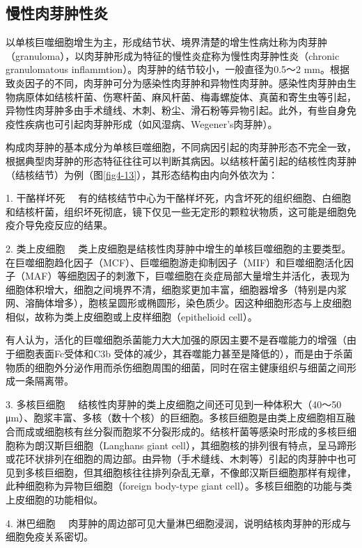 \subsection{慢性肉芽肿性炎}

以单核巨噬细胞增生为主，形成结节状、境界清楚的增生性病灶称为肉芽肿（granuloma），以肉芽肿形成为特征的慢性炎症称为慢性肉芽肿性炎（chronic
granulomatous inflammtion）。肉芽肿的结节较小，一般直径为0.5～2
mm。根据致炎因子的不同，肉芽肿可分为感染性肉芽肿和异物性肉芽肿。感染性肉芽肿由生物病原体如结核杆菌、伤寒杆菌、麻风杆菌、梅毒螺旋体、真菌和寄生虫等引起，异物性肉芽肿多由手术缝线、木刺、粉尘、滑石粉等异物引起。此外，有些自身免疫性疾病也可引起肉芽肿形成（如风湿病、Wegener's肉芽肿）。

构成肉芽肿的基本成分为单核巨噬细胞，不同病因引起的肉芽肿形态不完全一致，根据典型肉芽肿的形态特征往往可以判断其病因。以结核杆菌引起的结核性肉芽肿（结核结节）为例（图\ref{fig4-13}），其形态结构由内向外依次为：

{1. 干酪样坏死}
　有的结核结节中心为干酪样坏死，内含坏死的组织细胞、白细胞和结核杆菌，组织坏死彻底，镜下仅见一些无定形的颗粒状物质，这可能是细胞免疫介导免疫反应的结果。

{2. 类上皮细胞}
　类上皮细胞是结核性肉芽肿中增生的单核巨噬细胞的主要类型。在巨噬细胞趋化因子（MCF）、巨噬细胞游走抑制因子（MIF）和巨噬细胞活化因子（MAF）等细胞因子的刺激下，巨噬细胞在炎症局部大量增生并活化，表现为细胞体积增大，细胞之间境界不清，细胞浆更加丰富，细胞器增多（特别是内浆网、溶酶体增多），胞核呈圆形或椭圆形，染色质少。因这种细胞形态与上皮细胞相似，故称为类上皮细胞或上皮样细胞（epithelioid
cell）。

有人认为，活化的巨噬细胞杀菌能力大大加强的原因主要不是吞噬能力的增强（由于细胞表面Fc受体和C{3b}
受体的减少，其吞噬能力甚至是降低的），而是由于杀菌物质的细胞外分泌作用而杀伤细胞周围的细菌，同时在宿主健康组织与细菌之间形成一条隔离带。

{3. 多核巨细胞} 　结核性肉芽肿的类上皮细胞之间还可见到一种体积大（40～50
μm）、胞浆丰富、多核（数十个核）的巨细胞。多核巨细胞是由类上皮细胞相互融合而成或细胞核有丝分裂而胞浆不分裂形成的。结核杆菌等感染时形成的多核巨细胞称为朗汉斯巨细胞（Langhans
giant
cell），其细胞核的排列很有特点，呈马蹄形或花环状排列在细胞的周边部。由异物（手术缝线、木刺等）引起的肉芽肿中也可见到多核巨细胞，但其细胞核往往排列杂乱无章，不像郎汉斯巨细胞那样有规律，此种细胞称为异物巨细胞（foreign
body-type giant cell）。多核巨细胞的功能与类上皮细胞的功能相似。

{4. 淋巴细胞}
　肉芽肿的周边部可见大量淋巴细胞浸润，说明结核肉芽肿的形成与细胞免疫关系密切。

